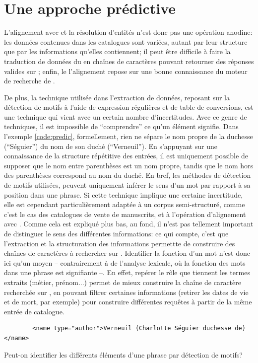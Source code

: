 \section{Une approche prédictive}
L'alignement avec \wkd{} et la résolution d'entités n'est donc pas une opération anodine: les données contenues dans les catalogues sont variées, autant par leur structure que par les informations qu'elles contiennent; il peut être difficile à faire la traduction de données du  en chaînes de caractères pouvant retourner des réponses valides sur \wkd{}; enfin, le l'alignement repose sur une bonne connaissance du moteur de recherche de \wkd{}. 

De plus, la technique utilisée dans l'extraction de données, reposant sur la détection de motifs à l'aide de \glspl{expression régulière} et de \glspl{table de conversion}, est une technique qui vient avec un certain nombre d'incertitudes. Avec ce genre de techniques, il est impossible de \enquote{comprendre} ce qu'un élément signifie. Dans l'exemple \ref{code:predic}, formellement, rien ne sépare le nom propre de la duchesse (\enquote{Séguier}) du nom de son duché (\enquote{Verneuil}). En s'appuyant sur une connaissance de la structure répétitive des entrées, il est uniquement possible de supposer que le nom entre parenthèses est un nom propre, tandis que le nom hors des parenthèses correspond au nom du duché. En bref, les méthodes de détection de motifs utilisées, peuvent uniquement inférer le sens d'un mot par rapport à sa position dans une phrase. Si cette technique implique une certaine incertitude, elle est cependant particulièrement adaptée à un corpus semi-structuré, comme c'est le cas des catalogues de vente de manuscrits, et à l'opération d'alignement avec \wkd{}. Comme cela est expliqué plus bas, au fond, il n'est pas tellement important de distinguer le sens des différentes informations: ce qui compte, c'est que l'extraction et la structuration des informations permettte de construire des chaînes de caractères à rechercher sur \wkd{}. Identifier la fonction d'un mot n'est donc ici qu'un moyen -- contrairement à de l'analyse lexicale, où la fonction des mots dans une phrase est signifiante --. En effet, repérer le rôle que tiennent les termes extraits (métier, prénom...) permet de mieux construire la chaîne de caractère recherchée sur \wkd{}, en pouvant filtrer certaines informations (retirer les dates de vie et de mort, par exemple) pour construire différentes requêtes à partir de la même entrée de catalogue.

\begin{listing}
	\begin{verbatim}
		<name type="author">Verneuil (Charlotte Séguier duchesse de)</name>
	\end{verbatim}
	\caption{Peut-on identifier les différents éléments d'une phrase par détection de motifs?}
	\label{code:predic}
\end{listing}

